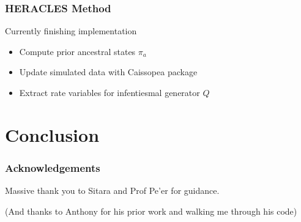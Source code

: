 \documentclass[
	11pt, %
]{beamer}
\begin{document}

\begin{frame}
	\frametitle{HERACLES Method}

	Currently finishing implementation

	\begin{itemize}
		\item Compute prior ancestral states $\pi_a$
		\item Update simulated data with Caissopea package
		\item Extract rate variables for infentiesmal generator $Q$
	\end{itemize}
\end{frame}

\section{Conclusion}


\begin{frame}
	\frametitle{Acknowledgements}
	
	Massive thank you to Sitara and Prof Pe'er for guidance.
	\bigskip

	(And thanks to Anthony for his prior work and walking me through his code)
\end{frame}
\end{document}
